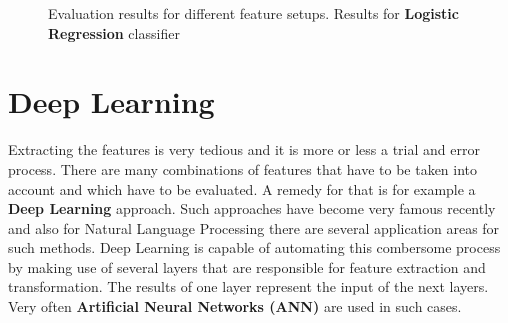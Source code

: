 \documentclass[journal, a4paper, 12pt]{IEEEtran}
\begin{document}
\begin{figure}[!h]
	\begin{center}
		\caption{Evaluation results for different feature setups. Results for \textbf{Logistic Regression} classifier}
		\label{fig:results-logistic}
		\vspace{5mm}
	\end{center}
\end{figure}

\section{Deep Learning}

Extracting the features is very tedious and it is more or less a trial and error process. There are many combinations of features that have to be taken into account and which have to be evaluated. A remedy for that is for example a \textbf{Deep Learning} approach. Such approaches have become very famous recently and also for Natural Language Processing there are several application areas for such methods. Deep Learning is capable of automating this combersome process by making use of several layers that are responsible for feature extraction and transformation. The results of one layer represent the input of the next layers. Very often \textbf{Artificial Neural Networks (ANN)} are used in such cases.
\end{document}
